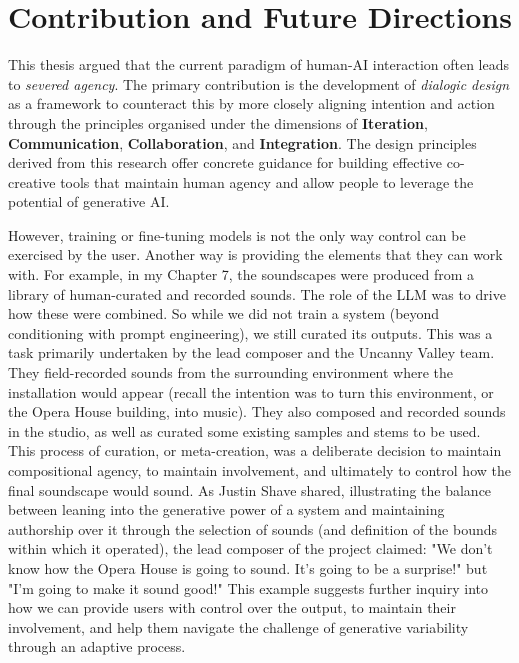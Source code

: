 \section{Contribution and Future Directions}
This thesis argued that the current paradigm of human-AI interaction often leads to \textit{severed agency}. The primary contribution is the development of \textit{dialogic design} as a framework to counteract this by more closely aligning intention and action through the principles organised under the dimensions of \textbf{Iteration}, \textbf{Communication}, \textbf{Collaboration}, and \textbf{Integration}. The design principles derived from this research offer concrete guidance for building effective co-creative tools that maintain human agency and allow people to leverage the potential of generative AI.





However, training or fine-tuning models is not the only way control can be exercised by the user. Another way is providing the elements that they can work with. For example, in my Chapter 7, the soundscapes were produced from a library of human-curated and recorded sounds. The role of the LLM was to drive how these were combined. So while we did not train a system (beyond conditioning with prompt engineering), we still curated its outputs. This was a task primarily undertaken by the lead composer and the Uncanny Valley team. They field-recorded sounds from the surrounding environment where the installation would appear (recall the intention was to turn this environment, or the Opera House building, into music). They also composed and recorded sounds in the studio, as well as curated some existing samples and stems to be used. This process of curation, or meta-creation, was a deliberate decision to maintain compositional agency, to maintain involvement, and ultimately to control how the final soundscape would sound. As Justin Shave shared, illustrating the balance between leaning into the generative power of a system and maintaining authorship over it through the selection of sounds (and definition of the bounds within which it operated), the lead composer of the project claimed: "We don't know how the Opera House is going to sound. It's going to be a surprise!" but "I'm going to make it sound good!" This example suggests further inquiry into how we can provide users with control over the output, to maintain their involvement, and help them navigate the challenge of generative variability through an adaptive process.
